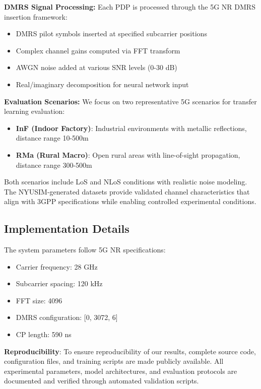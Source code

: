 \documentclass[conference]{IEEEtran}
\begin{document}
\textbf{DMRS Signal Processing:}
Each PDP is processed through the 5G NR DMRS insertion framework:
\begin{itemize}
\item DMRS pilot symbols inserted at specified subcarrier positions
\item Complex channel gains computed via FFT transform
\item AWGN noise added at various SNR levels (0-30 dB)
\item Real/imaginary decomposition for neural network input
\end{itemize}

\textbf{Evaluation Scenarios:}
We focus on two representative 5G scenarios for transfer learning evaluation:
\begin{itemize}
\item \textbf{InF (Indoor Factory)}: Industrial environments with metallic reflections, distance range 10-500m
\item \textbf{RMa (Rural Macro)}: Open rural areas with line-of-sight propagation, distance range 300-500m
\end{itemize}

Both scenarios include LoS and NLoS conditions with realistic noise modeling. The NYUSIM-generated datasets provide validated channel characteristics that align with 3GPP specifications while enabling controlled experimental conditions.

\subsection{Implementation Details}

The system parameters follow 5G NR specifications:
\begin{itemize}
\item Carrier frequency: 28 GHz
\item Subcarrier spacing: 120 kHz
\item FFT size: 4096
\item DMRS configuration: [0, 3072, 6]
\item CP length: 590 ns
\end{itemize}

\textbf{Reproducibility}: To ensure reproducibility of our results, complete source code, configuration files, and training scripts are made publicly available. All experimental parameters, model architectures, and evaluation protocols are documented and verified through automated validation scripts.
\end{document}

